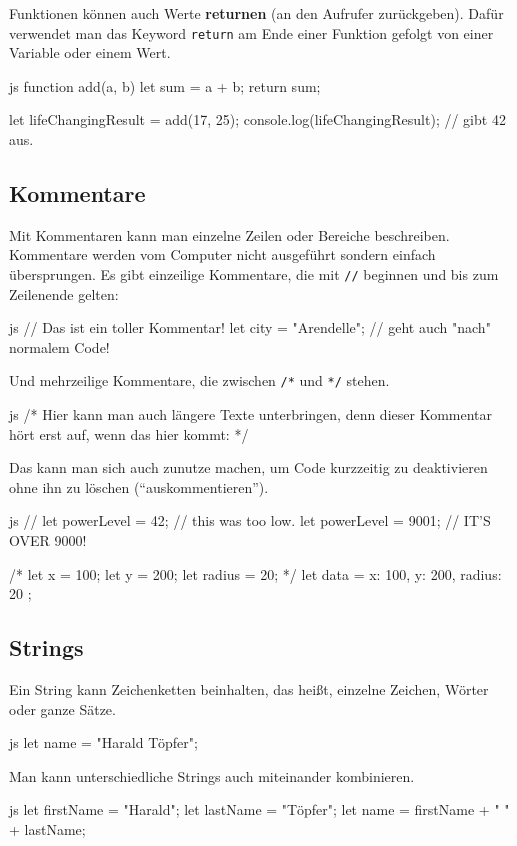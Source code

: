 \documentclass[10pt,a4paper]{article}
\begin{document}
\begin{multicols}{3}
Funktionen können auch Werte \textbf{returnen} (an den Aufrufer zurückgeben). Dafür verwendet man das Keyword \texttt{return} am Ende einer Funktion gefolgt von einer Variable oder einem Wert.
\begin{codebox}{js}{}
  function add(a, b) {
    let sum = a + b;
    return sum;
  }
  
  let lifeChangingResult = add(17, 25);
  console.log(lifeChangingResult); // gibt 42 aus.
\end{codebox}


\subsection*{Kommentare}
Mit Kommentaren kann man einzelne Zeilen oder Bereiche beschreiben. Kommentare werden vom Computer nicht ausgeführt sondern einfach übersprungen. Es gibt einzeilige Kommentare, die mit \texttt{//} beginnen und bis zum Zeilenende gelten:
\begin{codebox}{js}{}
  // Das ist ein toller Kommentar!
  let city = "Arendelle"; // geht auch "nach" normalem Code!
\end{codebox}

Und mehrzeilige Kommentare, die zwischen \texttt{/*} und \texttt{*/} stehen.
\begin{codebox}{js}{}
  /* Hier kann man auch längere Texte unterbringen,
  denn dieser Kommentar hört erst auf, wenn
  das hier kommt: */
\end{codebox}

Das kann man sich auch zunutze machen, um Code kurzzeitig zu deaktivieren ohne ihn zu löschen (\enquote{auskommentieren}).
\begin{codebox}{js}{}
  // let powerLevel = 42; // this was too low.
  let powerLevel = 9001; // IT'S OVER 9000!

  /*
  let x = 100;
  let y = 200;
  let radius = 20;
  */
  let data = {
    x: 100,
    y: 200,
    radius: 20
  };
\end{codebox}

\subsection*{Strings}
Ein String kann Zeichenketten beinhalten, das heißt, einzelne Zeichen, Wörter oder ganze Sätze.
\begin{codebox}{js}{}
  let name = "Harald Töpfer";
\end{codebox}
Man kann unterschiedliche Strings auch miteinander kombinieren.
\begin{codebox}{js}{}
  let firstName = "Harald";
  let lastName = "Töpfer";
  let name = firstName + " " + lastName;
\end{codebox}


\end{multicols}
\end{document}
